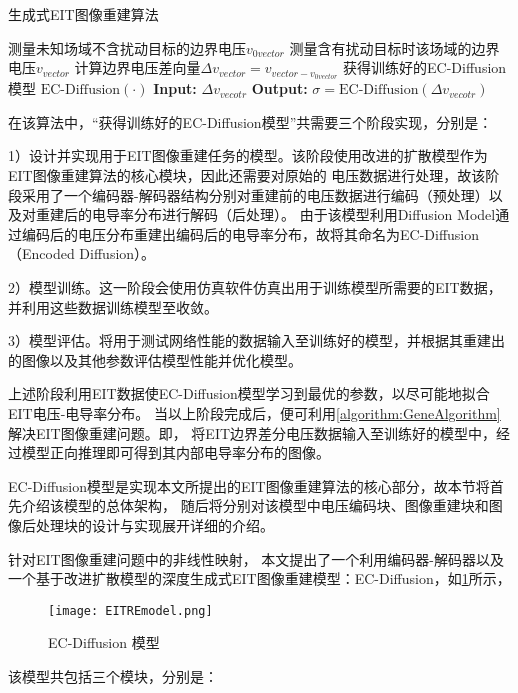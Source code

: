 \begin{algorithm}[H]
    
    \caption{生成式EIT图像重建算法}
    \begin{algorithmic}[1]
        \State 测量未知场域不含扰动目标的边界电压$v_{0vector}$
        \State 测量含有扰动目标时该场域的边界电压$v_{vector}$
        \State 计算边界电压差向量$\Delta v_{vector} = v_{vector - v_{0vector}}$
        \State 获得训练好的EC-Diffusion 模型 $\text{EC-Diffusion}(\cdot)$
        \State \textbf{Input:} $\Delta v_{vecotr}$
        \State \textbf{Output:} $ \sigma  = \text{EC-Diffusion}(\Delta v_{vecotr})$
    \end{algorithmic}
    \label{algorithm:GeneAlgorithm}
\end{algorithm}

在该算法中，“获得训练好的EC-Diffusion模型”共需要三个阶段实现，分别是：

1）设计并实现用于EIT图像重建任务的模型。该阶段使用改进的扩散模型作为EIT图像重建算法的核心模块，因此还需要对原始的
电压数据进行处理，故该阶段采用了一个编码器-解码器结构分别对重建前的电压数据进行编码（预处理）以及对重建后的电导率分布进行解码（后处理）。
由于该模型利用Diffusion Model通过编码后的电压分布重建出编码后的电导率分布，故将其命名为EC-Diffusion（Encoded Diffusion）。

2）模型训练。这一阶段会使用仿真软件仿真出用于训练模型所需要的EIT数据，并利用这些数据训练模型至收敛。

3）模型评估。将用于测试网络性能的数据输入至训练好的模型，并根据其重建出的图像以及其他参数评估模型性能并优化模型。

上述阶段利用EIT数据使EC-Diffusion模型学习到最优的参数，以尽可能地拟合EIT电压-电导率分布。
当以上阶段完成后，便可利用\cref{algorithm:GeneAlgorithm}解决EIT图像重建问题。即，
将EIT边界差分电压数据输入至训练好的模型中，经过模型正向推理即可得到其内部电导率分布的图像。




EC-Diffusion模型是实现本文所提出的EIT图像重建算法的核心部分，故本节将首先介绍该模型的总体架构，
随后将分别对该模型中电压编码块、图像重建块和图像后处理块的设计与实现展开详细的介绍。

\label{section:Model}

针对EIT图像重建问题中的非线性映射，
本文提出了一个利用编码器-解码器以及一个基于改进扩散模型的深度生成式EIT图像重建模型：EC-Diffusion，如\cref{figure:EITREmodel}所示，

\begin{figure}[h]
    \centering
    \texttt{[image: EITREmodel.png]}
    \caption{EC-Diffusion 模型}
    \label{figure:EITREmodel}
\end{figure}
该模型共包括三个模块，分别是：


